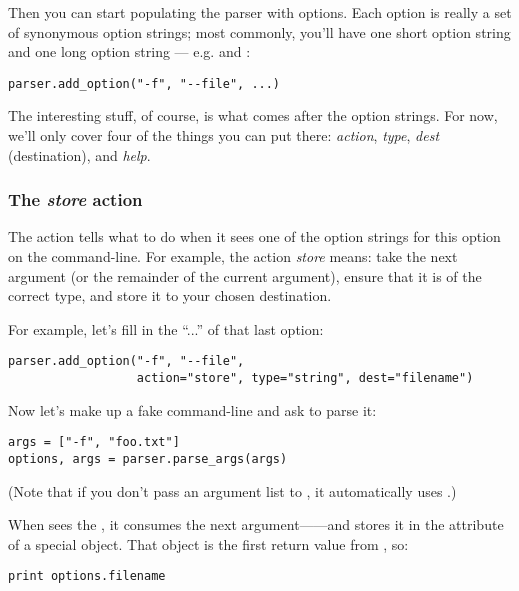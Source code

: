 Then you can start populating the parser with options.  Each option is
really a set of synonymous option strings; most commonly, you'll have
one short option string and one long option string ---
e.g.  and :

\begin{verbatim}
parser.add_option("-f", "--file", ...)
\end{verbatim}

The interesting stuff, of course, is what comes after the option
strings.  For now, we'll only cover four of the things you can put
there: \emph{action}, \emph{type}, \emph{dest} (destination), and
\emph{help}.

\subsubsection{The \emph{store} action%
               \label{optparse-store-action}}

The action tells  what to do when it sees one of the
option strings for this option on the command-line.  For example, the
action \emph{store} means: take the next argument (or the remainder of
the current argument), ensure that it is of the correct type, and
store it to your chosen destination.

For example, let's fill in the ``...'' of that last option:

\begin{verbatim}
parser.add_option("-f", "--file",
                  action="store", type="string", dest="filename")
\end{verbatim}

Now let's make up a fake command-line and ask  to
parse it:

\begin{verbatim}
args = ["-f", "foo.txt"]
options, args = parser.parse_args(args)
\end{verbatim}

(Note that if you don't pass an argument list to
, it automatically uses .)

When  sees the , it consumes the next
argument------and stores it in the 
attribute of a special object.  That object is the first return value
from , so:

\begin{verbatim}
print options.filename
\end{verbatim}

